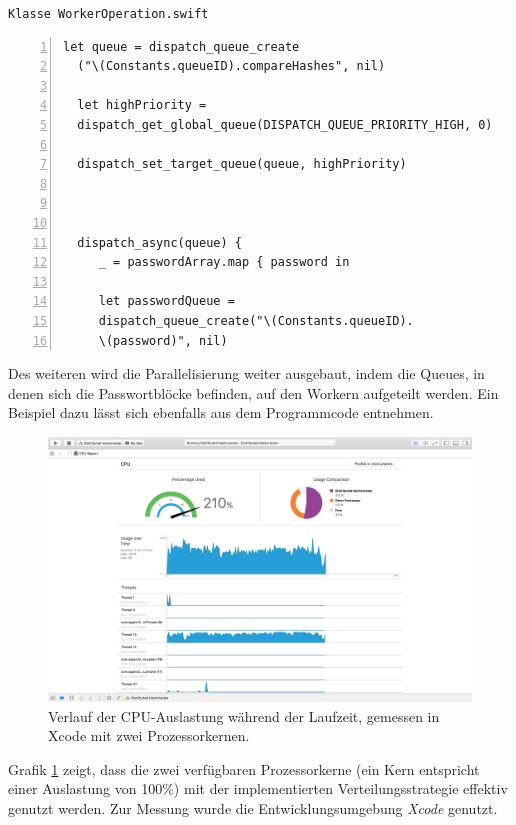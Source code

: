 \texttt{Klasse WorkerOperation.swift}
\begin{lstlisting}[basicstyle=\ttfamily,numbers=left,numberstyle=\footnotesize\ttfamily,backgroundcolor=\color{sourcegray}]
  let queue = dispatch_queue_create
  ("\(Constants.queueID).compareHashes", nil)
  
  let highPriority = 
  dispatch_get_global_queue(DISPATCH_QUEUE_PRIORITY_HIGH, 0)
  
  dispatch_set_target_queue(queue, highPriority)
  
  
  
  dispatch_async(queue) {
     _ = passwordArray.map { password in
     
     let passwordQueue = 
     dispatch_queue_create("\(Constants.queueID).
     \(password)", nil)
\end{lstlisting}

Des weiteren wird die Parallelisierung weiter ausgebaut, indem die Queues, in denen sich die Passwortblöcke befinden, auf den Workern aufgeteilt werden. Ein Beispiel dazu lässt sich ebenfalls aus dem Programmcode entnehmen. \\

\begin{figure}[!ht]
	\centering
		\includegraphics[natwidth=1200pt, natheight=349pt, width=1.0\textwidth]{images/screenshot_cpu.png}
	\caption{Verlauf der CPU-Auslastung während der Laufzeit, gemessen in Xcode mit zwei Prozessorkernen.}
	\label{fig:screenshotCPU}
\end{figure}


Grafik \ref{fig:screenshotCPU} zeigt, dass die zwei verfügbaren Prozessorkerne (ein Kern entspricht einer Auslastung von 100\%) mit der implementierten Verteilungsstrategie effektiv genutzt werden. Zur Messung wurde die Entwicklungsumgebung \emph{Xcode} genutzt. 

